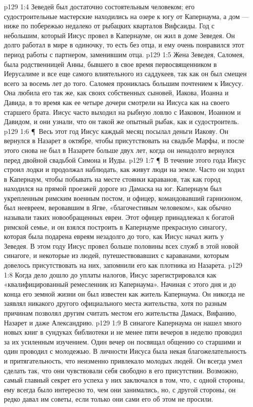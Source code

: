 \vs p129 1:4 Зеведей был достаточно состоятельным человеком; его судостроительные мастерские находились на озере к югу от Капернаума, а дом --- ниже по побережью недалеко от рыбацких кварталов Вифсаиды. Год с небольшим, который Иисус провел в Капернауме, он жил в доме Зеведея. Он долго работал в мире в одиночку, то есть без отца, и ему очень понравился этот период работы с партнером, заменившим отца.
\vs p129 1:5 Жена Зеведея, Саломея, была родственницей Анны, бывшего в свое время первосвященником в Иерусалиме и все еще самого влиятельного из саддукеев, так как он был смещен всего за восемь лет до того. Саломея прониклась большим почтением к Иисусу. Она любила его так же, как своих собственных сыновей, Иакова, Иоанна и Давида, в то время как ее четыре дочери смотрели на Иисуса как на своего старшего брата. Иисус часто выходил на рыбную ловлю с Иаковом, Иоанном и Давидом, и они узнали, что он такой же опытный рыбак, как и судостроитель.
\vs p129 1:6 \P\ Весь этот год Иисус каждый месяц посылал деньги Иакову. Он вернулся в Назарет в октябре, чтобы присутствовать на свадьбе Марфы, и после этого снова не был в Назарете больше двух лет, когда он ненадолго вернулся перед двойной свадьбой Симона и Иуды.
\vs p129 1:7 \P\ В течение этого года Иисус строил лодки и продолжал наблюдать, как живут люди на земле. Часто он ходил в Капернаум, чтобы побывать на месте стоянки караванов, так как город находился на прямой проезжей дороге из Дамаска на юг. Капернаум был укрепленным римским военным постом, и офицер, командовавший гарнизоном, был неевреем, веровавшим в Ягве, «благочестивым человеком», как обычно называли таких новообращенных евреи. Этот офицер принадлежал к богатой римской семье, и он взялся построить в Капернауме прекрасную синагогу, которая была подарена евреям незадолго до того, как Иисус начал жить у Зеведея. В этом году Иисус провел больше половины всех служб в этой новой синагоге, и некоторые из людей, путешествовавших с караванами, которым довелось присутствовать на них, запомнили его как плотника из Назарета.
\vs p129 1:8 Когда дело дошло до уплаты налогов, Иисус зарегистрировался как «квалифицированный ремесленник из Капернаума». Начиная с этого дня и до конца его земной жизни он был известен как житель Капернаума. Он никогда не заявлял никакого другого официального места жительства, хотя по разным причинам позволял другим считать местом его жительства Дамаск, Вифанию, Назарет и даже Александрию.
\vs p129 1:9 В синагоге Капернаума он нашел много новых книг в сундуках библиотеки и не менее пяти вечеров в неделю проводил за их усиленным изучением. Один вечер он посвящал общению со старшими и один проводил с молодежью. В личности Иисуса была некая благожелательность и притягательность, что неизменно привлекало молодых людей. Он всегда умел сделать так, что они чувствовали себя свободно в его присутствии. Возможно, самый главный секрет его успеха у них заключался в том, что, с одной стороны, ему всегда было интересно то, чем они занимались, но, с другой стороны, он редко давал им советы, если только они сами его об этом не просили.
